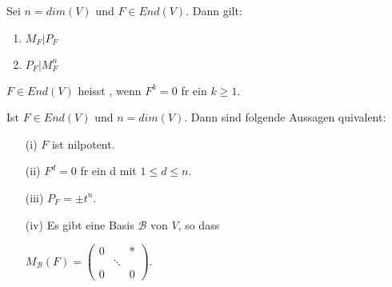 \documentclass[11pt, a4paper]{article}
\begin{document}
\begin{theorem}
Sei $n = dim (V)$ und $F \in End(V)$. Dann gilt:
\begin{enumerate}
\item $M_F | P_F$
\item $P_F | M_F^n$
\end{enumerate}
\end{theorem}
\begin{definition}
$F \in End(V)$ heisst , wenn $F^k = 0$ f\uee r ein $k \geq 1$.
\end{definition}
\begin{theorem}
Ist $F \in End(V)$ und $n = dim(V)$. Dann sind folgende Aussagen \aee quivalent:
\begin{itemize}
\item[(i)] $F$ ist nilpotent.
\item[(ii)] $F^d = 0$ f\uee r ein d mit $1 \leq d \leq n$.
\item[(iii)] $P_F = \pm t^n$.
\item[(iv)] Es gibt eine Basis $\mathcal{B}$ von $V$, so dass 
\\ \centerline{
$M_{\mathcal{B}}(F)=\left(\begin{array}{ccc}
{0} & {} & {*} \\ {} & {\ddots} & {} 
\\ {0} & {} & {0}\end{array}\right)$.
}
\end{itemize}
\end{theorem}
\end{document}
